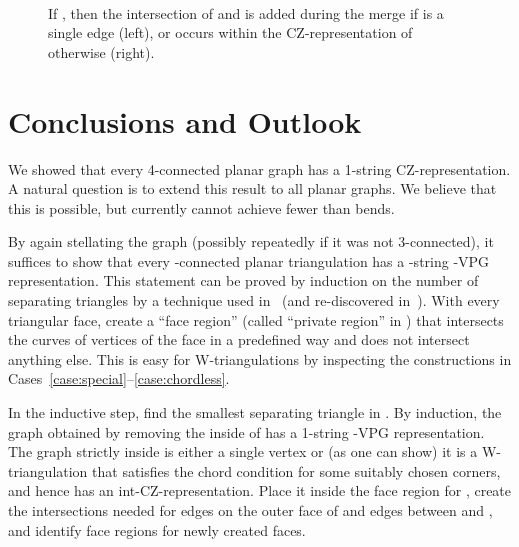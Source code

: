 \documentclass{article}
\newtheorem{observation}[theorem]{Observation}
\begin{document}
\begin{figure}
	\centering
~~~~~~~~~~~
	\caption{If , then the intersection of  and  is added during the merge if  is a single edge (left), or occurs within
the CZ-representation of  otherwise (right).}
        \label{fig:case5extended}
\end{figure}

\section{Conclusions and Outlook}
\label{sec:conclusions}
\label{sec:outlook}

We showed that every 4-connected planar graph has a 1-string CZ-representation. A natural 
question is to extend this result to all planar graphs. We believe that this is possible,
but currently cannot achieve fewer than  bends.


\iffalse
\begin{observation}[Chalopin, Gon\c{c}alves, Ochem~{\cite[Lemma~1]{cit:chalopin-string}}]
\label{obs:triangulation-only}
    Every planar graph  is an induced subgraph of a~-connected 
    planar triangulation. 
\end{observation}
\fi
    
By again stellating the graph (possibly repeatedly if it was not 3-connected),
it suffices to show that every -connected
planar triangulation has a -string -VPG representation. This statement can be proved by induction
on the number of separating triangles by a technique used in~\cite{cit:chalopin-string}
(and re-discovered in~\cite{cit:mfcs}). With every triangular face,
create a ``face region'' (called ``private region'' in \cite{cit:mfcs})
that intersects the curves of vertices of the face
in a predefined way and does not intersect anything else. This is easy for 
W-triangulations by inspecting the constructions in Cases~\ref{case:special}--\ref{case:chordless}.

In the inductive step, find the smallest separating triangle  in .
By induction, the graph  obtained by removing the inside of
 has a 1-string -VPG representation. 
The graph  strictly inside  is either a single vertex or (as one
can show) it is a W-triangulation that satisfies the chord condition for
some suitably chosen corners, and hence has an int-CZ-representation.
Place it inside the face region for ,
create the intersections needed for edges on the outer face of  and
edges between  and , and
identify face regions for newly created faces.
\end{document}
